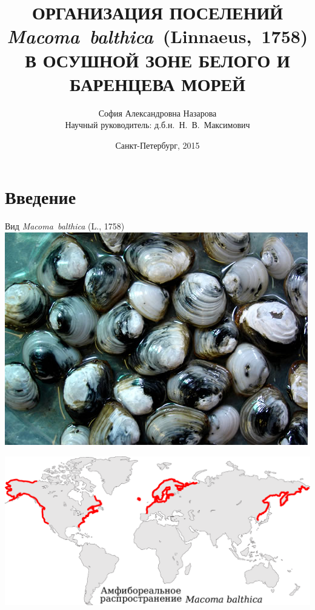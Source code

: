 \documentclass{beamer}
\begin{document}
\title[]{ОРГАНИЗАЦИЯ ПОСЕЛЕНИЙ\\ {\it Macoma~balthica}~(Linnaeus,~1758)\\ В ОСУШНОЙ ЗОНЕ БЕЛОГО И БАРЕНЦЕВА МОРЕЙ}
\author[]{София Александровна Назарова \\ \medskip
	\footnotesize{Научный руководитель: д.б.н.~Н.~В.~Максимович}}
\date{Санкт-Петербург, 2015} 

\frame{\titlepage} 





		\section{Введение}
\begin{frame}{Вид {\it Macoma~balthica} (L., 1758)}
			\includegraphics[width=.49\textwidth]{Baltic_macoma.jpg}	%

			\includegraphics[width=.9\textwidth]{areal_line.pdf}


\end{frame}
\end{document}
